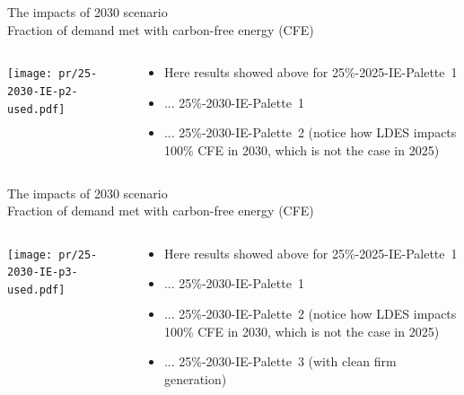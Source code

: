 \begin{frame}{The impacts of 2030 scenario  \\ 
Fraction of demand met with carbon-free energy (CFE) }

\begin{columns}[T]
\begin{column}{9cm}
\centering

\texttt{[image: pr/25-2030-IE-p2-used.pdf]}
\end{column}
\begin{column}{5cm}

  \begin{itemize}
  \item Here results showed above for 25\%-\alert{2025}-IE-Palette~1
  \item ... 25\%-\alert{2030}-IE-Palette~1
  \item ... 25\%-\alert{2030}-IE-Palette~2 (notice how LDES impacts 100\% CFE in 2030, which is not the case in 2025)
  \end{itemize}
  
\end{column}
\end{columns}

\end{frame}


\begin{frame}{The impacts of 2030 scenario  \\ 
Fraction of demand met with carbon-free energy (CFE) }

\begin{columns}[T]
\begin{column}{9cm}
\centering

\texttt{[image: pr/25-2030-IE-p3-used.pdf]}
\end{column}
\begin{column}{5cm}

  \begin{itemize}
  \item Here results showed above for 25\%-\alert{2025}-IE-Palette~1
  \item ... 25\%-\alert{2030}-IE-Palette~1
  \item ... 25\%-\alert{2030}-IE-Palette~2 (notice how LDES impacts 100\% CFE in 2030, which is not the case in 2025)
 \item ... 25\%-\alert{2030}-IE-Palette~3 (with clean firm generation)
  \end{itemize}
  
\end{column}
\end{columns}

\end{frame}


